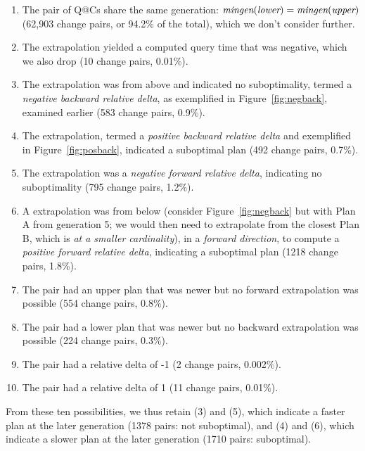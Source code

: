 \documentclass[prodmode,acmtods]{acmsmall}
\begin{document}
\begin{enumerate}
\item The pair of Q@Cs share the same generation: $\hbox{\em mingen}(\hbox{\em lower}) =
\hbox{\em mingen}(\hbox{\em upper})$  (62,903 change pairs, or 94.2\% of the
total), which we don't consider further.

\item The extrapolation yielded a computed query
time that was negative, which we also drop (10 change pairs, 0.01\%).

\item The extrapolation was from above and indicated
no suboptimality, termed a {\em negative backward relative
  delta}, as
  exemplified in Figure~\ref{fig:negback}, examined earlier (583 change pairs,
  0.9\%).

\item The extrapolation, termed a {\em positive backward
    relative delta} and exemplified in Figure~\ref{fig:posback}, indicated
  a suboptimal plan (492 change pairs, 0.7\%).

\item The extrapolation was a {\em negative forward relative delta},
  indicating no suboptimality (795 change pairs, 1.2\%).

\item A extrapolation was from below (consider Figure~\ref{fig:negback} but with
  Plan A from generation 5; we would then need to extrapolate from the
  closest Plan B, which is {\em at a smaller cardinality}), in a {\em forward
    direction}, to compute a {\em positive forward relative delta},
  indicating a suboptimal plan (1218 change pairs, 1.8\%).

\item The pair had an upper plan that was newer but no forward extrapolation
  was possible (554 change pairs, 0.8\%).

\item The pair had a lower plan that was newer but no backward extrapolation
  was possible (224 change pairs, 0.3\%).

\item The pair had a relative delta of -1 (2 change pairs, 0.002\%).

\item The pair had a relative delta of 1 (11 change pairs, 0.01\%).

\end{enumerate}
From these ten possibilities, we thus retain (3) and (5), which indicate a
faster plan at the later generation (1378 pairs: not suboptimal), and (4) and (6), which indicate a
slower plan at the later generation (1710 pairs: suboptimal).
\end{document}
